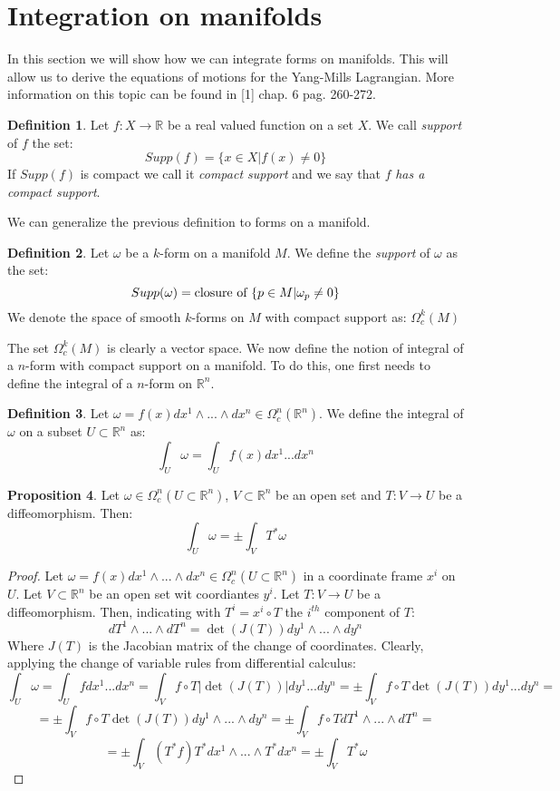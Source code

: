 \documentclass[12pt,a4paper]{report}
\theoremstyle{definition}
\newtheorem{Def}{Definition}[chapter]
\theoremstyle{Theorem}
\newtheorem{Prop}[Def]{Proposition}
\theoremstyle{definition}
\theoremstyle{definition}
\begin{document}
	\section{{Integration on manifolds}}
	In this section we will show how we can integrate forms on manifolds. This will allow us to derive the equations of motions for the Yang-Mills Lagrangian. More information on this topic can be found in [1] chap. 6 pag. 260-272.
	\begin{Def}
		Let $f:X\rightarrow \mathbb{R}$ be a real valued function on a set $X$. We call \textit{support} of $f$ the set:
		$$Supp(f)=\{x\in X|f(x)\neq 0\}$$
		If $Supp(f)$ is compact we call it \textit{compact support} and we say that $f$ \textit{has a compact support}.
	\end{Def}
	We can generalize the previous definition to forms on a manifold.
	\begin{Def}
		Let $\omega$ be a $k$-form on a manifold $M$. We define the \textit{support} of $\omega$ as the set:
		$$Supp(\omega)=\hbox{closure of }\{p\in M|\omega_p\neq 0\}$$
		We denote the space of smooth $k$-forms on $M$ with compact support as: $\Omega_c^k(M)$
	\end{Def}
	The set $\Omega^k_c(M)$ is clearly a vector space.
	We now define the notion of integral of a $n$-form with compact support on a manifold. To do this, one first needs to define the integral of a $n$-form on $\mathbb{R}^n$.
	\begin{Def}
		Let $\omega=f(x)dx^1\wedge...\wedge dx^n\in\Omega^n_c(\mathbb{R}^n)$. We define the integral of $\omega$ on a subset $U\subset\mathbb{R}^n$ as:
		$$\int_U\omega=\int_Uf(x)dx^1...dx^n$$ 
	\end{Def}
	\begin{Prop}
		Let $\omega\in\Omega^n_c(U\subset \mathbb{R}^n)$, $V\subset \mathbb{R}^n$ be an open set and $T:V\rightarrow U$ be a diffeomorphism. Then:
		$$\int_U\omega=\pm\int_VT^*\omega$$
	\end{Prop}
	\begin{proof}
		Let $\omega=f(x)dx^1\wedge...\wedge dx^n\in\Omega^n_c(U\subset \mathbb{R}^n)$ in a coordinate frame $x^i$ on $U$. Let $V\subset \mathbb{R}^n$ be an open set wit coordiantes $y^i$. Let $T:V\rightarrow U$ be a diffeomorphism. Then, indicating with $T^i=x^i\circ T$ the $i^{th}$ component of $T$:
		$$dT^1\wedge...\wedge dT^n=\det( J(T))dy^1\wedge...\wedge dy^n$$
		Where $J(T)$ is the Jacobian matrix of the change of coordinates. Clearly, applying the change of variable rules from differential calculus:
		$$\int_U\omega=\int_Uf dx^1...dx^n=\int_V f\circ T |\det(J(T))|dy^1...dy^n=\pm\int_V f\circ T \det(J(T))dy^1...dy^n=$$
		$$=\pm\int_V f\circ T \det(J(T))dy^1\wedge...\wedge dy^n=\pm\int_V f\circ T dT^1\wedge...\wedge dT^n=$$
		$$=\pm\int_V(T^*f)T^*dx^1\wedge...\wedge T^*dx^n=\pm\int_V T^*\omega$$
	\end{proof}
\end{document}
